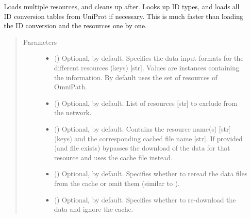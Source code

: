 \documentclass[letterpaper,10pt,english]{sphinxmanual}
\begin{document}
\begin{fulllineitems}
\begin{fulllineitems}
\label{\detokenize{main:pypath.main.PyPath.load_resources}}
Loads multiple resources, and cleans up after. Looks up ID
types, and loads all ID conversion tables from UniProt if
necessary. This is much faster than loading the ID conversion
and the resources one by one.
\begin{quote}\begin{description}
\item[{Parameters}] \leavevmode\begin{itemize}
\item {} 
 () \textendash{} Optional,  by default. Specifies the data input
formats for the different resources (keys) {[}str{]}. Values
are  instances
containing the information. By default uses the set of
resources of OmniPath.

\item {} 
 () \textendash{} Optional, \sphinxcode{\sphinxupquote{{[}{]}}} by default. List of resources {[}str{]} to
exclude from the network.

\item {} 
 () \textendash{} Optional, \sphinxcode{\sphinxupquote{\{\}}} by default. Contains the resource name(s)
{[}str{]} (keys) and the corresponding cached file name {[}str{]}.
If provided (and file exists) bypasses the download of the
data for that resource and uses the cache file instead.

\item {} 
 () \textendash{} Optional,  by default. Specifies whether to reread
the data files from the cache or omit them (similar to
).

\item {} 
 () \textendash{} Optional,  by default. Specifies whether to
re-download the data and ignore the cache.


\end{itemize}
\end{description}
\end{quote}
\end{fulllineitems}
\end{fulllineitems}
\end{document}
